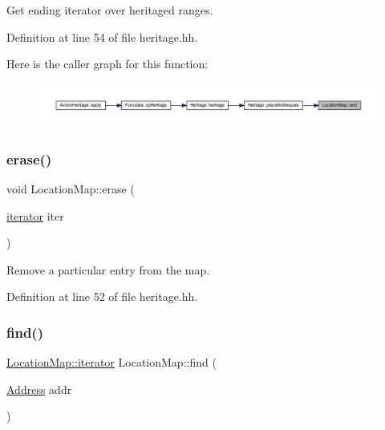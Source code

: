 Get ending iterator over heritaged ranges. 



Definition at line 54 of file heritage.\+hh.

Here is the caller graph for this function\+:
\nopagebreak
\begin{figure}[H]
\begin{center}
\leavevmode
\includegraphics[width=350pt]{class_location_map_a9d4bddedee005e780986d9752b93e4f0_icgraph}
\end{center}
\end{figure}
\mbox{\label{class_location_map_a50624e32845eeea2cc26a7379c57111d}} 
\subsubsection{\texorpdfstring{erase()}{erase()}}
{\footnotesize\ttfamily void Location\+Map\+::erase (\begin{DoxyParamCaption}\item[{\mbox{\hyperlink{class_location_map_a13612b4d0583b85205f3ad6476c2aef9}{iterator}}}]{iter }\end{DoxyParamCaption})\hspace{0.3cm}{\ttfamily [inline]}}



Remove a particular entry from the map. 



Definition at line 52 of file heritage.\+hh.

\mbox{\label{class_location_map_a46317268798a00ecc792e87a4a360bef}} 
\subsubsection{\texorpdfstring{find()}{find()}}
{\footnotesize\ttfamily \mbox{\hyperlink{class_location_map_a13612b4d0583b85205f3ad6476c2aef9}{Location\+Map\+::iterator}} Location\+Map\+::find (\begin{DoxyParamCaption}\item[{\mbox{\hyperlink{class_address}{Address}}}]{addr }\end{DoxyParamCaption})}



